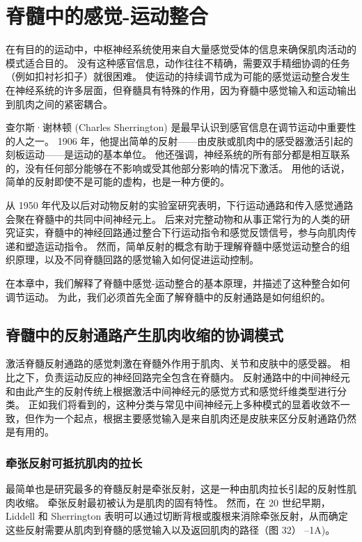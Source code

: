\chapter{脊髓中的感觉-运动整合} \label{chap:chap32}

在有目的的运动中，中枢神经系统使用来自大量感觉受体的信息来确保肌肉活动的模式适合目的。
没有这种感官信息，动作往往不精确，需要双手精细协调的任务（例如扣衬衫扣子）就很困难。
使运动的持续调节成为可能的感觉运动整合发生在神经系统的许多层面，但脊髓具有特殊的作用，因为脊髓中感觉输入和运动输出到肌肉之间的紧密耦合。


查尔斯·谢林顿 (Charles Sherrington) 是最早认识到感官信息在调节运动中重要性的人之一。
1906 年，他提出简单的反射——由皮肤或肌肉中的感受器激活引起的刻板运动——是运动的基本单位。
他还强调，神经系统的所有部分都是相互联系的，没有任何部分能够在不影响或受其他部分影响的情况下激活。
用他的话说，简单的反射即使不是可能的虚构，也是一种方便的。


从 1950 年代及以后对动物反射的实验室研究表明，下行运动通路和传入感觉通路会聚在脊髓中的共同中间神经元上。
后来对完整动物和从事正常行为的人类的研究证实，脊髓中的神经回路通过整合下行运动指令和感觉反馈信号，参与向肌肉传递和塑造运动指令。
然而，简单反射的概念有助于理解脊髓中感觉运动整合的组织原理，以及不同脊髓回路的感觉输入如何促进运动控制。


在本章中，我们解释了脊髓中感觉-运动整合的基本原理，并描述了这种整合如何调节运动。
为此，我们必须首先全面了解脊髓中的反射通路是如何组织的。



\section{脊髓中的反射通路产生肌肉收缩的协调模式}

激活脊髓反射通路的感觉刺激在脊髓外作用于肌肉、关节和皮肤中的感受器。
相比之下，负责运动反应的神经回路完全包含在脊髓内。 
反射通路中的中间神经元和由此产生的反射传统上根据激活中间神经元的感觉方式和感觉纤维类型进行分类。
正如我们将看到的，这种分类与常见中间神经元上多种模式的显着收敛不一致，但作为一个起点，根据主要感觉输入是来自肌肉还是皮肤来区分反射通路仍然是有用的。



\subsection{牵张反射可抵抗肌肉的拉长}

最简单也是研究最多的脊髓反射是牵张反射，这是一种由肌肉拉长引起的反射性肌肉收缩。
牵张反射最初被认为是肌肉的固有特性。
然而，在 20 世纪早期，Liddell 和 Sherrington 表明可以通过切断背根或腹根来消除牵张反射，从而确定这些反射需要从肌肉到脊髓的感觉输入以及返回肌肉的路径（图 32） –1A)。


